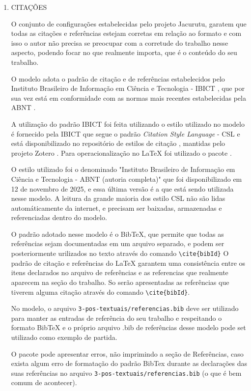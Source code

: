 \begin{enumerate}
	\item \MakeUppercase{Citações}

	O conjunto de configurações estabelecidas pelo projeto Jacurutu, garatem que todas as citações e referências estejam corretas em relação ao formato e com isso o autor não precisa se preocupar com a corretude do trabalho nesse aspecto, podendo focar no que realmente importa, que é o conteúdo do seu trabalho.

	O modelo adota o padrão de citação e de referências estabelecidos pelo Instituto Brasileiro de Informação em Ciência e Tecnologia - IBICT \cite{ibict_site}, que por sua vez está em conformidade com as normas mais recentes estabelecidas pela ABNT \cite{ibict_abnt}.

	A utilização do padrão IBICT foi feita utilizando o estilo utilizado no modelo é fornecido pela IBICT que segue o padrão \textit{Citation Style Language} - CSL \cite{csl} e está disponibilizado no repositório de estilos de citação \cite{zotero_repositorio}, mantidas pelo projeto Zotero \cite{zotero}. Para operacionalização no {\LaTeX} foi utilizado o pacote \cite{csl_package}.

	O estilo utilizado foi o denominado "Instituto Brasileiro de Informação em Ciência e Tecnologia - ABNT (autoria completa)" \cite{ibict_estilo} que foi disponibilizado em 12 de novembro de 2025, e essa última versão é a que está sendo utilizada nesse modelo. A leitura da grande maioria dos estilo CSL não são lidas automáticamente da internet, e precisam ser baixadas, armazenadas e referenciadas dentro do modelo.

	O padrão adotado nesse modelo é o BibTeX, que permite que todas as referências sejam documentadas em um arquivo separado, e podem ser posteriormente urilizados no texto através do comando \verb|\cite{bibId}| O padrão de citação e referências do {\LaTeX} garantem uma consistência entre os itens declarados no arquivo de referências e as referencias que realmente aparecem na seção do trabalho. So serão apresentadas as referências que tiverem alguma citação através do comando \verb|\cite{bibId}|.

	No modelo, o arquivo \verb|3-pos-textuais/referencias.bib| deve ser utilizado para manter as entradas de referência do seu trabalho e respeitando o formato BibTeX e o próprio arquivo .bib de referências desse modelo pode set utilizado como exemplo de partida.

	O pacote \cite{csl_package} pode apresentar erros, não imprimindo a seção de Referências, caso exista algum erro de formatação do padrão BibTex durante as declarações das suas referências no arquivo \verb|3-pos-textuais/referencias.bib| (o que é bem comum de acontecer).


\end{enumerate}
